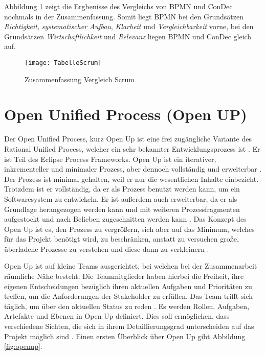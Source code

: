 Abbildung \ref{fig:TabelleScrum} zeigt die Ergbenisse des Vergleichs von BPMN und ConDec nochmals in der Zusammenfassung. Somit liegt BPMN bei den Grundsätzen \textit{Richtigkeit}, \textit{systematischer Aufbau}, \textit{Klarheit} und \textit{Vergleichbarkeit} vorne, bei den Grundsätzen \textit{Wirtschaftlichkeit} und \textit{Relevanz} liegen BPMN und ConDec gleich auf. \newline

\begin{figure}[htp]
\begin{center}
  \texttt{[image: TabelleScrum]} %
  \caption{Zusammenfassung Vergleich Scrum}
  \label{fig:TabelleScrum}
\end{center}
\end{figure}




\section{Open Unified Process (Open UP)}


Der Open Unified Process, kurz Open Up ist eine frei zugängliche Variante des Rational Unified Process, welcher ein sehr bekannter Entwicklungsprozess ist \cite{hauber2010}.  Er ist Teil des Eclipse Process Frameworks. Open Up ist ein iterativer, inkrementeller und minimaler Prozess, aber dennoch vollständig und erweiterbar \cite{Gau2006, Basem2010}. Der Prozess ist minimal gehalten, weil er nur die wesentlichen Inhalte einbezieht. Trotzdem ist er vollständig, da er als Prozess benutzt werden kann, um ein Softwaresystem zu entwickeln. Er ist außerdem auch erweiterbar, da er als Grundlage herangezogen werden kann und mit weiteren Prozessfragmenten aufgestockt und nach Belieben zugeschnitten werden kann \cite{Wang2007}. Das Konzept des Open Up ist es, den Prozess zu vergrößern, sich aber auf das Minimum, welches für das Projekt benötigt wird, zu beschränken, anstatt zu versuchen große, überladene Prozesse zu verstehen und diese dann zu verkleinern \cite{ambler2012}.  \newline



Open Up ist auf kleine Teams ausgerichtet, bei welchen bei der Zusammenarbeit räumliche Nähe besteht. Die Teammitglieder haben hierbei die Freiheit, ihre eigenen Entscheidungen bezüglich ihren aktuellen Aufgaben und Prioritäten zu treffen, um die Anforderungen der Stakeholder zu erfüllen. Das Team trifft sich täglich, um über den aktuellen Status zu reden \cite{OpenUPProcess}.\newline
Es werden Rollen, Aufgaben, Artefakte und Ebenen in Open Up definiert. Dies soll ermöglichen, dass verschiedene Sichten, die sich in ihrem Detaillierungsgrad unterscheiden auf das Projekt möglich sind \cite{freudenreichevaluierung}. Einen ersten Überblick über Open Up gibt Abbildung \ref{fig:openup}.


